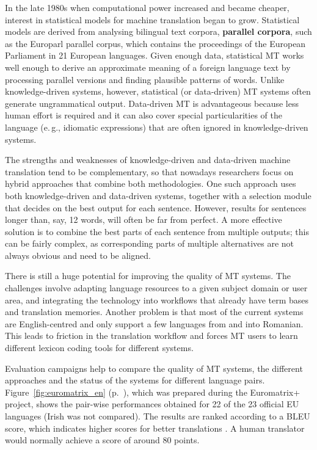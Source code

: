 \begin{multicols}{2}
In the late 1980s when computational power increased and became cheaper, interest in statistical models for machine translation began to grow. Statistical models are derived from analysing bilingual text corpora, \textbf{parallel corpora}, such as the Europarl parallel corpus, which contains the proceedings of the European Parliament in 21 European languages. Given enough data, statistical MT works well enough to derive an approximate meaning of a foreign language text by processing parallel versions and finding plausible patterns of words. Unlike knowledge-driven systems, however, statistical (or data-driven) MT systems often generate ungrammatical output. Data-driven MT is advantageous because less human effort is required and it can also cover special particularities of the language (e.\,g., idiomatic expressions) that are often ignored in knowledge-driven systems. 

The strengths and weaknesses of knowledge-driven and data-driven machine translation tend to be complementary, so that nowadays researchers focus on hybrid approaches that combine both methodologies. One such approach uses both knowledge-driven and data-driven systems, together with a selection module that decides on the best output for each sentence. However, results for sentences longer than, say, 12 words, will often be far from perfect. A more effective solution is to combine the best parts of each sentence from multiple outputs; this can be fairly complex, as corresponding parts of multiple alternatives are not always obvious and need to be aligned. 

There is still a huge potential for improving the quality of MT systems. The challenges involve adapting language resources to a given subject domain or user area, and integrating the technology into workflows that already have term bases and translation memories. Another problem is that most of the current systems are English-centred and only support a few languages from and into Romanian. This leads to friction in the translation workflow and forces MT users to learn different lexicon coding tools for different systems.

Evaluation campaigns help to compare the quality of MT systems, the different approaches and the status of the systems for different language pairs. Figure~\ref{fig:euromatrix_en} (p.~\pageref{fig:euromatrix_en}), which was prepared during the Euromatrix+ project, shows the pair-wise performances obtained for 22 of the 23 official EU languages (Irish was not compared). The results are ranked according to a BLEU score, which indicates higher scores for better translations \cite{bleu1}. A human translator would normally achieve a score of around 80 points.


\end{multicols}
